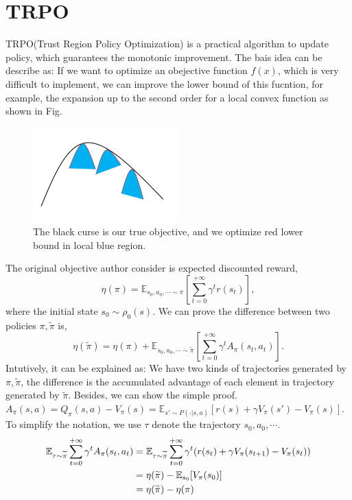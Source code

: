 \documentclass[11pt,a4paper]{article}
\def\tilde{\widetilde}
\def\tilde{\widetilde}
\def\E{\mathbb{E}}
\begin{document}
\section{TRPO}
TRPO(Trust Region Policy Optimization)\cite{schulman2015trust} is a practical algorithm to update policy, which guarantees the monotonic improvement. The bais idea can be describe as: If we want to optimize an obejective function $f(x)$, which is very difficult to implement, we can improve the lower bound of this fucntion, for example, the expansion up to the second order for a local convex function as shown in Fig.
\begin{figure}[htb]
\center
\includegraphics[width=0.5\textwidth]{TRPO.png}
\caption{The black curse is our true objective, and we optimize red lower bound in local blue region.}
\end{figure}
The original objective author consider is expected discounted reward,
\begin{equation}
    \eta(\pi) = \E_{s_0,a_0,\cdots \sim \pi}[\sum_{t=0}^{+\infty}\gamma^t r(s_t)],
\end{equation}
where the initial state $s_0 \sim \rho_0(s)$.
We can prove the difference between two policies $\pi, \tilde{\pi}$ is,
\begin{equation}
    \label{eq:TRPO_eta}
    \eta(\tilde{\pi}) = \eta(\pi) + \E_{s_0, a_0, \cdots \sim \tilde{\pi}}[\sum_{t=0}^{+\infty}\gamma^tA_{\pi}(s_t,a_t)].
\end{equation}
Intutively, it can be explained as: We have two kinds of trajectories generated by $\pi, \tilde{\pi}$, the difference is the accumulated advantage of each element in trajectory generated by $\tilde{\pi}$. Besides, we can show the simple proof. $A_{\pi}(s,a) = Q_{\pi}(s,a)-V_{\pi}(s) = \E_{s'\sim P(\cdot|s,a)}[r(s)+\gamma V_{\pi}(s')-V_{\pi}(s)]$. To simplify the notation, we use $\tau$ denote the trajectory $s_0, a_0, \cdots$.
\begin{equation}
\aligned 
\E_{\tau\sim\tilde{\pi}}\sum_{t=0}^{+\infty} \gamma^t A_{\pi}(s_t,a_t) & = \E_{\tau \sim \tilde{\pi}}\sum_{t=0}^{+\infty} \gamma^t (r(s_t)+\gamma V_{\pi}(s_{t+1}) - V_{\pi}(s_t)) \\ & = \eta(\tilde{\pi}) - \E_{s_0}[V_{\pi}(s_0)] \\ & = \eta(\tilde{\pi}) - \eta(\pi)
\endaligned
\end{equation}
\end{document}
